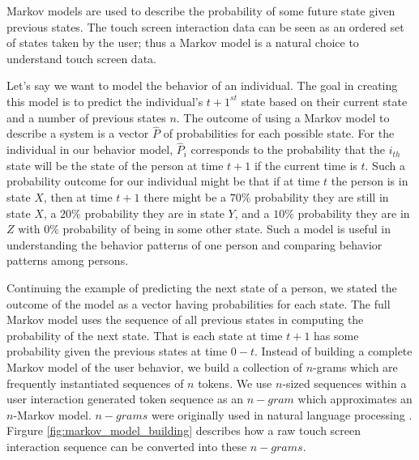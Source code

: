 Markov models are used to describe
the probability of some future state given previous states.
The touch screen interaction data can be seen as
an ordered set of states taken by the user;
thus a Markov model 
is a natural choice
to understand touch screen data.

Let's say we want to model the behavior of an individual.
The goal in creating
this model is to predict the individual's $t+1^{st}$ state
based on their current state and
a number of previous states $n$.
%
The outcome of using a Markov model to describe a system
is a vector $\hat{P}$ of probabilities for each possible state.
For the individual in our behavior model,
$\hat{P}_i$ corresponds to the probability that the $i_{th}$ state
will be the state of the person at time $t+1$ 
if the current time is $t$.
%
Such a probability outcome for our individual might be
that if at time $t$ the person is in state $X$,
then at time $t+1$ there might be 
a $70\%$ probability they are still in state $X$,
a $20\%$ probability they are in state $Y$, and
a $10\%$ probability they are in $Z$ with
$0\%$ probability of being in some other state.
%
Such a model is useful in understanding 
the behavior patterns of one person and
comparing behavior patterns among persons.

Continuing the example of predicting
the next state of a person,
we stated the outcome of the model as a vector
having probabilities for each state.
The full Markov model uses the sequence of all previous states
in computing the probability of the next state.
%
That is each state at time $t+1$ 
has some probability 
given the previous states at time $0-t$.
%
Instead of building a complete Markov model of the user behavior,
we build a collection of $n$-grams
which are frequently instantiated sequences of $n$ tokens.
We use $n$-sized sequences 
within a user interaction
generated token sequence as an
$n-gram$ which approximates an $n$-Markov model.
$n-grams$ were originally
used in natural language processing \cite{Brown:ngram}.
%
Firgure \ref{fig:markov_model_building} describes
how a raw touch screen interaction sequence can be
converted into these $n-grams$.


